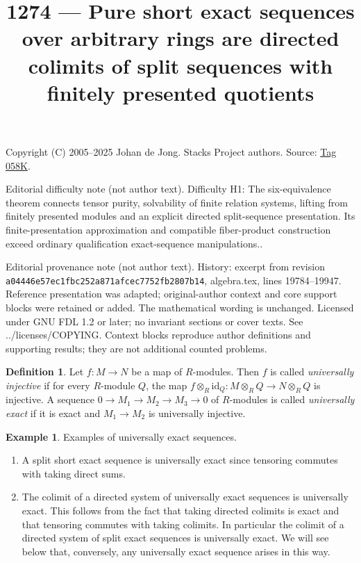 \documentclass{amsart}
\theoremstyle{plain}
\theoremstyle{definition}
\newtheorem{definition}[subsection]{Definition}
\newtheorem{example}[subsection]{Example}
\theoremstyle{remark}
\numberwithin{equation}{subsection}
\begin{document}
\title[Stacks Project, Tag 058K]{1274 --- Pure short exact sequences over arbitrary rings are directed colimits of split sequences with finitely presented quotients}
\maketitle
\noindent Copyright (C) 2005--2025 Johan de Jong. Stacks Project authors. Source: \href{https://stacks.math.columbia.edu/tag/058K}{Tag 058K}.

\noindent Editorial difficulty note (not author text). Difficulty H1: The six-equivalence theorem connects tensor purity, solvability of finite relation systems, lifting from finitely presented modules and an explicit directed split-sequence presentation. Its finite-presentation approximation and compatible fiber-product construction exceed ordinary qualification exact-sequence manipulations..

\noindent Editorial provenance note (not author text). History: excerpt from revision \texttt{a0444\allowbreak 6e57e\allowbreak c1fbc\allowbreak 252a8\allowbreak 71afc\allowbreak ec775\allowbreak 2fb28\allowbreak 07b14}, algebra.tex, lines 19784--19947. Reference presentation was adapted; original-author context and core support blocks were retained or added. The mathematical wording is unchanged. Licensed under GNU FDL 1.2 or later; no invariant sections or cover texts. See ../licenses/COPYING. Context blocks reproduce author definitions and supporting results; they are not additional counted problems.

\begin{definition}
\label{definition-universally-injective}
Let $f: M \to N$ be a map of $R$-modules.  Then $f$ is called
{\it universally injective} if for every $R$-module $Q$, the map $f
\otimes_R \text{id}_Q: M \otimes_R Q \to N \otimes_R Q$
is injective.  A sequence $0 \to M_1 \to M_2 \to M_3
\to 0$ of $R$-modules is called {\it universally exact} if it is exact
and $M_1 \to M_2$ is universally injective.
\end{definition}

\begin{example}
\label{example-universally-exact}
Examples of universally exact sequences.
\begin{enumerate}
\item A split short exact sequence is universally exact since tensoring
commutes with taking direct sums.
\item The colimit of a directed system of universally exact sequences is
universally exact.  This follows from the fact that taking directed colimits is
exact and that tensoring commutes with taking colimits.  In particular the
colimit of a directed system of split exact sequences is universally exact.  We
will see below that, conversely, any universally exact sequence arises in this
way.
\end{enumerate}
\end{example}
\end{document}
